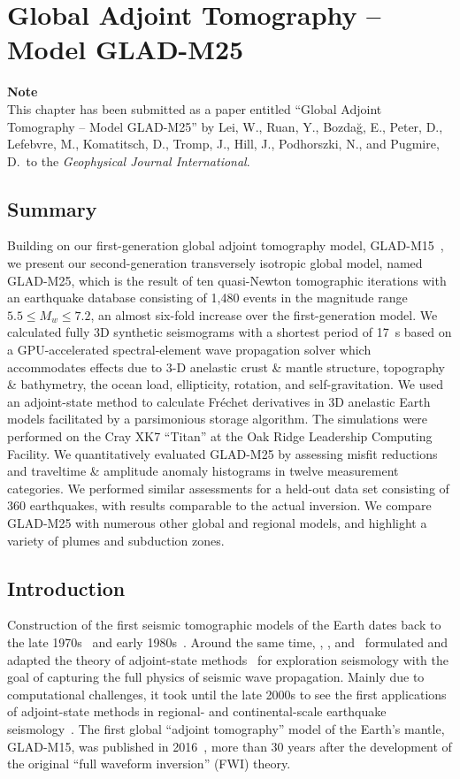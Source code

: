 \chapter{Global Adjoint Tomography -- Model GLAD-M25\label{ch:GLAD-M25}}

\textbf{Note}\\
This chapter has been submitted as a paper entitled ``Global Adjoint Tomography -- Model GLAD-M25'' by Lei, W., Ruan, Y., Bozda\u{g}, E., Peter, D., Lefebvre, M., Komatitsch, D., Tromp, J., Hill, J.,  Podhorszki, N., and Pugmire, D.\ to the \textit{Geophysical Journal International}.

\section{Summary}
Building on our first-generation global adjoint tomography model,
GLAD-M15~\cite{bozdaug2016global}, we present our second-generation transversely isotropic global model,
named GLAD-M25, which is the result of ten quasi-Newton tomographic iterations with an
earthquake database consisting of 1,480 events in the magnitude range $5.5\le M_w \le 7.2$,
an almost six-fold increase over the first-generation model.
We calculated fully 3D synthetic seismograms with a shortest period of 17~s based on a GPU-accelerated spectral-element wave
propagation solver which accommodates effects due to 3-D anelastic crust \& mantle structure, topography \& bathymetry, the ocean load, ellipticity, rotation, and self-gravitation.
We used an adjoint-state method to calculate Fr\'echet derivatives in 3D anelastic Earth models
facilitated by a parsimonious storage algorithm.
The simulations were performed on the Cray XK7 ``Titan'' at the Oak Ridge Leadership Computing Facility.
We quantitatively evaluated GLAD-M25 by assessing misfit reductions and traveltime \& amplitude anomaly histograms in twelve measurement
categories.
We performed similar assessments for a held-out data set consisting of 360 earthquakes,
with results comparable to the actual inversion.
We compare GLAD-M25 with numerous other global and regional models,
and highlight a variety of plumes and subduction zones.

\section{Introduction}

Construction of the first seismic tomographic models of the Earth dates back to the late 1970s~\cite{Aki77,Dziewonski77,SenTok77} and early 1980s~\cite{WD84, Nataf1984}.
Around the same time,
\cite{BaChLa77}, \cite{Lailly1983}, and~\cite{Tar84} formulated and adapted the theory of adjoint-state methods~\cite{Chavent1974} for exploration seismology with the goal of capturing the full physics of seismic wave propagation.
Mainly due to computational challenges,
it took until the late 2000s to see the first applications of adjoint-state methods in regional- and continental-scale earthquake seismology~\cite{tape2009adjoint,Fichtner09,zhu2012structure}.
The first global ``adjoint tomography'' model of the Earth's mantle,
GLAD-M15, was published in 2016~\cite{bozdaug2016global}, more than 30 years after the development of the original ``full waveform inversion'' (FWI) theory.

